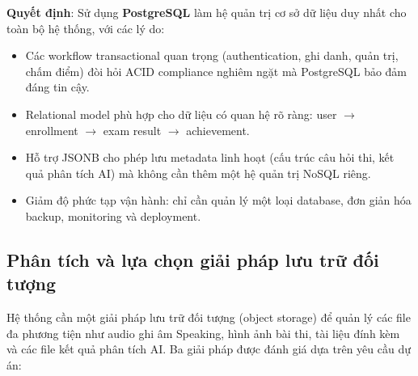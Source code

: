 \textbf{Quyết định}: Sử dụng \textbf{PostgreSQL} làm hệ quản trị cơ sở dữ liệu duy nhất cho toàn bộ hệ thống, với các lý do:

\begin{itemize}
\item Các workflow transactional quan trọng (authentication, ghi danh, quản trị, chấm điểm) đòi hỏi ACID compliance nghiêm ngặt mà PostgreSQL bảo đảm đáng tin cậy.
\item Relational model phù hợp cho dữ liệu có quan hệ rõ ràng: user $\rightarrow$ enrollment $\rightarrow$ exam result $\rightarrow$ achievement.
\item Hỗ trợ JSONB cho phép lưu metadata linh hoạt (cấu trúc câu hỏi thi, kết quả phân tích AI) mà không cần thêm một hệ quản trị NoSQL riêng.
\item Giảm độ phức tạp vận hành: chỉ cần quản lý một loại database, đơn giản hóa backup, monitoring và deployment. \cite{postgresql}
\end{itemize}

\subsection{Phân tích và lựa chọn giải pháp lưu trữ đối tượng}

Hệ thống cần một giải pháp lưu trữ đối tượng (object storage) để quản lý các file đa phương tiện như audio ghi âm Speaking, hình ảnh bài thi, tài liệu đính kèm và các file kết quả phân tích AI. Ba giải pháp được đánh giá dựa trên yêu cầu dự án:

\begin{table}[H]
    \centering
    \caption{So sánh giải pháp lưu trữ đối tượng theo yêu cầu dự án}
    \label{tab:storage_comp}
    \scriptsize
\end{table}


